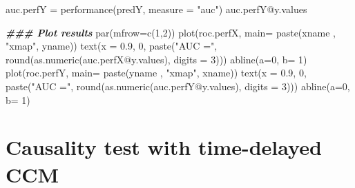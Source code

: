 \documentclass[
]{article}
\newenvironment{Shaded}{\begin{snugshade}}{\end{snugshade}}
\newcommand{\AttributeTok}[1]{\textcolor[rgb]{0.77,0.63,0.00}{#1}}
\newcommand{\DecValTok}[1]{\textcolor[rgb]{0.00,0.00,0.81}{#1}}
\newcommand{\DocumentationTok}[1]{\textcolor[rgb]{0.56,0.35,0.01}{\textbf{\textit{#1}}}}
\newcommand{\FloatTok}[1]{\textcolor[rgb]{0.00,0.00,0.81}{#1}}
\newcommand{\FunctionTok}[1]{\textcolor[rgb]{0.00,0.00,0.00}{#1}}
\newcommand{\NormalTok}[1]{#1}
\newcommand{\OtherTok}[1]{\textcolor[rgb]{0.56,0.35,0.01}{#1}}
\newcommand{\SpecialCharTok}[1]{\textcolor[rgb]{0.00,0.00,0.00}{#1}}
\newcommand{\StringTok}[1]{\textcolor[rgb]{0.31,0.60,0.02}{#1}}
\begin{document}
\begin{Shaded}
\begin{Highlighting}[]
\NormalTok{auc.perfY }\OtherTok{=} \FunctionTok{performance}\NormalTok{(predY, }\AttributeTok{measure =} \StringTok{"auc"}\NormalTok{)}
\NormalTok{auc.perfY}\SpecialCharTok{@}\NormalTok{y.values}

\DocumentationTok{\#\#\# Plot results}
\FunctionTok{par}\NormalTok{(}\AttributeTok{mfrow=}\FunctionTok{c}\NormalTok{(}\DecValTok{1}\NormalTok{,}\DecValTok{2}\NormalTok{))}
\FunctionTok{plot}\NormalTok{(roc.perfX, }\AttributeTok{main=} \FunctionTok{paste}\NormalTok{(xname , }\StringTok{"xmap"}\NormalTok{, yname))}
\FunctionTok{text}\NormalTok{(}\AttributeTok{x =} \FloatTok{0.9}\NormalTok{, }\DecValTok{0}\NormalTok{, }\FunctionTok{paste}\NormalTok{(}\StringTok{"AUC ="}\NormalTok{, }\FunctionTok{round}\NormalTok{(}\FunctionTok{as.numeric}\NormalTok{(auc.perfX}\SpecialCharTok{@}\NormalTok{y.values), }\AttributeTok{digits =} \DecValTok{3}\NormalTok{)))}
\FunctionTok{abline}\NormalTok{(}\AttributeTok{a=}\DecValTok{0}\NormalTok{, }\AttributeTok{b=} \DecValTok{1}\NormalTok{)}
\FunctionTok{plot}\NormalTok{(roc.perfY, }\AttributeTok{main=} \FunctionTok{paste}\NormalTok{(yname , }\StringTok{"xmap"}\NormalTok{, xname))}
\FunctionTok{text}\NormalTok{(}\AttributeTok{x =} \FloatTok{0.9}\NormalTok{, }\DecValTok{0}\NormalTok{, }\FunctionTok{paste}\NormalTok{(}\StringTok{"AUC ="}\NormalTok{, }\FunctionTok{round}\NormalTok{(}\FunctionTok{as.numeric}\NormalTok{(auc.perfY}\SpecialCharTok{@}\NormalTok{y.values), }\AttributeTok{digits =} \DecValTok{3}\NormalTok{)))}
\FunctionTok{abline}\NormalTok{(}\AttributeTok{a=}\DecValTok{0}\NormalTok{, }\AttributeTok{b=} \DecValTok{1}\NormalTok{)}
\end{Highlighting}
\end{Shaded}

\hypertarget{causality-test-with-time-delayed-ccm}{%
\section{Causality test with time-delayed
CCM}\label{causality-test-with-time-delayed-ccm}}
\end{document}
